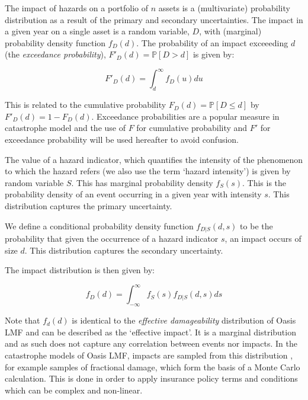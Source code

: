 \documentclass[a4paper,11pt]{extarticle} %
\theoremstyle{definition}
\begin{document}
The impact of hazards on a portfolio of $n$ assets is a (multivariate) probability distribution as a result of the primary and secondary uncertainties. The impact in a given year on a single asset is a random variable, $D$, with (marginal) probability density function $f_D(d)$. The probability of an impact exceeeding $d$ (the \emph{exceedance probability}), $F'_D(d) = \mathbb{P}[D > d]$ is given by:

 \begin{equation}
     \label{Eq:ImpactExceed}
     F'_D(d) = \int_d^{\infty} f_D(u) du
 \end{equation}

This is related to the cumulative probability $F_{D}(d) = \mathbb{P}[D \le d]$ by $F'_D(d) = 1 - F_D(d)$. Exceedance probabilities are a popular measure in catastrophe model and the use of $F$ for cumulative probability and $F'$ for exceedance probability will be used hereafter to avoid confusion.

The value of a hazard indicator, which quantifies the intensity of the phenomenon to which the hazard refers (we also use the term `hazard intensity') is given by random variable $S$. This has marginal  probability density $f_S(s)$. This is the probability density of an event occurring in a given year with intensity $s$. This distribution captures the primary uncertainty.

We define a conditional probability density function $f_{D|S}(d, s)$ to be the probability that given the occurrence of a hazard indicator $s$, an impact occurs of size $d$. This distribution captures the secondary uncertainty.

The impact distribution is then given by:

  \begin{equation}
     \label{Eq:ImpactEffective}
     f_D(d) = \int_{-\infty}^{\infty} f_S(s) f_{D|S}(d, s) ds
 \end{equation}

Note that $f_d(d)$ is identical to the {\it effective damageability} distribution of Oasis LMF\cite{OasisFinancialModule} and can be described as the `effective impact'. It is a marginal distribution and as such does not capture any correlation between events nor impacts. In the catastrophe models of Oasis LMF, impacts are sampled from this distribution \cite{OasisFinancialModule}, for example samples of fractional damage, which form the basis of a Monte Carlo calculation. This is done in order to apply insurance policy terms and conditions which can be complex and non-linear.
\end{document}
